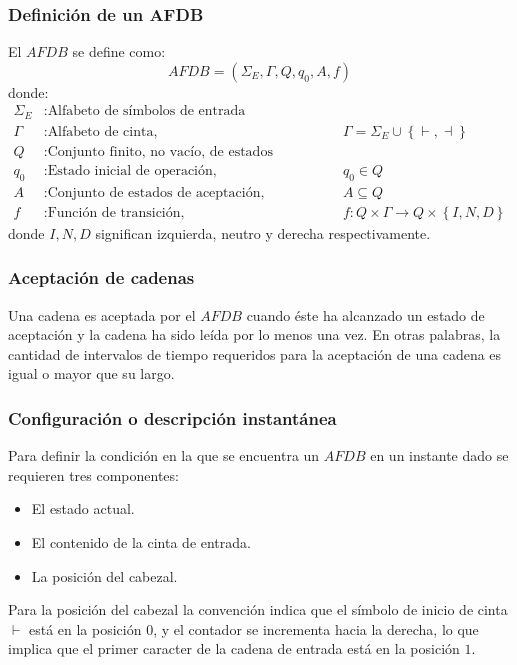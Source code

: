 \documentclass[12pt]{article}
\begin{document}
\subsubsection{Definición de un AFDB}
El $ AFDB $ se define como:
\[
AFDB = \left(\Sigma_{E},\Gamma,Q,q_{0},A,f\right)
\]
donde:
\begin{align*}
  \Sigma_{E} &: \text{Alfabeto de símbolos de entrada}\\
  \Gamma &: \text{Alfabeto de cinta,} && \Gamma=\Sigma_{E} \cup \left\{ \vdash, \dashv  \right\}\\
  Q &: \text{Conjunto finito, no vacío, de estados posibles}\\
  q_{0} &: \text{Estado inicial de operación,} && q_{0} \in Q\\
  A &: \text{Conjunto de estados de aceptación,} && A \subseteq Q\\
  f &: \text{Función de transición,} && f:Q\times \Gamma \to Q\times \left\{I,N,D\right\}
\end{align*}
donde $ I,N,D $ significan izquierda, neutro y derecha respectivamente.

\subsubsection{Aceptación de cadenas}
Una cadena es aceptada por el $ AFDB $ cuando éste ha alcanzado un estado de aceptación y la cadena ha sido leída por lo menos una vez. En otras palabras, la cantidad de intervalos de tiempo requeridos para la aceptación de una cadena es igual o mayor que su largo.

\subsubsection{Configuración o descripción instantánea}
Para definir la condición en la que se encuentra un $ AFDB $ en un instante dado se requieren tres componentes:
\begin{itemize}
  \item El estado actual.

  \item El contenido de la cinta de entrada.

  \item La posición del cabezal.
\end{itemize}

Para la posición del cabezal la convención indica que el símbolo de inicio de cinta $  \vdash  $ está en la posición $ 0 $, y el contador se incrementa hacia la derecha, lo que implica que el primer caracter de la cadena de entrada está en la posición $ 1 $.
\end{document}
